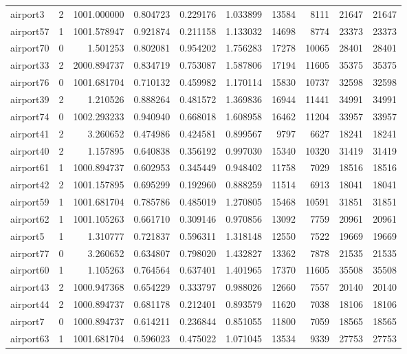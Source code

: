 \begin{longtable}{|l|r|r|r|r|r|r|r|r|r|}
airport3 & 2 & 1001.000000 & 0.804723 & 0.229176 & 1.033899 & 13584 & 8111 & 21647 & 21647 \\
airport57 & 1 & 1001.578947 & 0.921874 & 0.211158 & 1.133032 & 14698 & 8774 & 23373 & 23373 \\
airport70 & 0 & 1.501253 & 0.802081 & 0.954202 & 1.756283 & 17278 & 10065 & 28401 & 28401 \\
airport33 & 2 & 2000.894737 & 0.834719 & 0.753087 & 1.587806 & 17194 & 11605 & 35375 & 35375 \\
airport76 & 0 & 1001.681704 & 0.710132 & 0.459982 & 1.170114 & 15830 & 10737 & 32598 & 32598 \\
airport39 & 2 & 1.210526 & 0.888264 & 0.481572 & 1.369836 & 16944 & 11441 & 34991 & 34991 \\
airport74 & 0 & 1002.293233 & 0.940940 & 0.668018 & 1.608958 & 16462 & 11204 & 33957 & 33957 \\
airport41 & 2 & 3.260652 & 0.474986 & 0.424581 & 0.899567 & 9797 & 6627 & 18241 & 18241 \\
airport40 & 2 & 1.157895 & 0.640838 & 0.356192 & 0.997030 & 15340 & 10320 & 31419 & 31419 \\
airport61 & 1 & 1000.894737 & 0.602953 & 0.345449 & 0.948402 & 11758 & 7029 & 18516 & 18516 \\
airport42 & 2 & 1001.157895 & 0.695299 & 0.192960 & 0.888259 & 11514 & 6913 & 18041 & 18041 \\
airport59 & 1 & 1001.681704 & 0.785786 & 0.485019 & 1.270805 & 15468 & 10591 & 31851 & 31851 \\
airport62 & 1 & 1001.105263 & 0.661710 & 0.309146 & 0.970856 & 13092 & 7759 & 20961 & 20961 \\
airport5 & 1 & 1.310777 & 0.721837 & 0.596311 & 1.318148 & 12550 & 7522 & 19669 & 19669 \\
airport77 & 0 & 3.260652 & 0.634807 & 0.798020 & 1.432827 & 13362 & 7878 & 21535 & 21535 \\
airport60 & 1 & 1.105263 & 0.764564 & 0.637401 & 1.401965 & 17370 & 11605 & 35508 & 35508 \\
airport43 & 2 & 1000.947368 & 0.654229 & 0.333797 & 0.988026 & 12660 & 7557 & 20140 & 20140 \\
airport44 & 2 & 1000.894737 & 0.681178 & 0.212401 & 0.893579 & 11620 & 7038 & 18106 & 18106 \\
airport7 & 0 & 1000.894737 & 0.614211 & 0.236844 & 0.851055 & 11800 & 7059 & 18565 & 18565 \\
airport63 & 1 & 1001.681704 & 0.596023 & 0.475022 & 1.071045 & 13534 & 9339 & 27753 & 27753 \\

\end{longtable}
